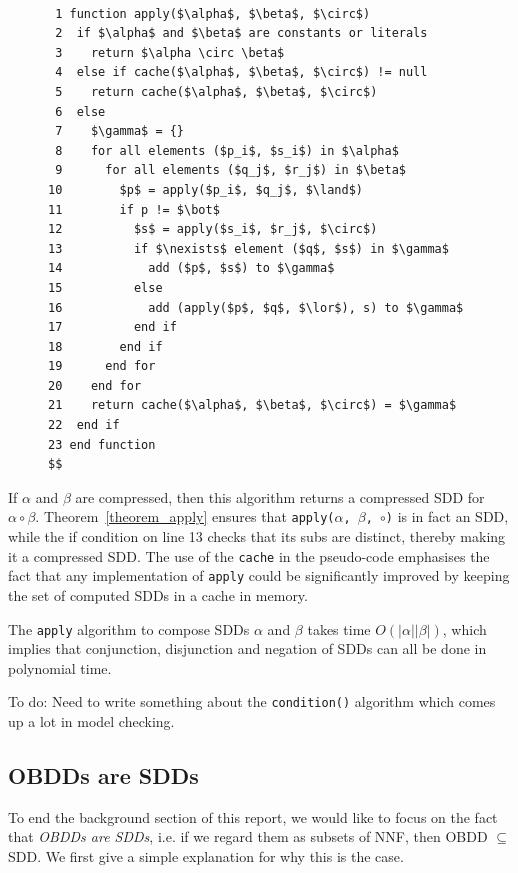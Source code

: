 \documentclass[11pt]{report}
\begin{document}
\label{operations}
 \begin{figure}
 
\begin{lstlisting}[mathescape]

 1 function apply($\alpha$, $\beta$, $\circ$)
 2  if $\alpha$ and $\beta$ are constants or literals
 3    return $\alpha \circ \beta$   
 4  else if cache($\alpha$, $\beta$, $\circ$) != null
 5    return cache($\alpha$, $\beta$, $\circ$)
 6  else
 7    $\gamma$ = {}
 8    for all elements ($p_i$, $s_i$) in $\alpha$
 9      for all elements ($q_j$, $r_j$) in $\beta$ 
10        $p$ = apply($p_i$, $q_j$, $\land$)
11        if p != $\bot$
12          $s$ = apply($s_i$, $r_j$, $\circ$)
13          if $\nexists$ element ($q$, $s$) in $\gamma$
14            add ($p$, $s$) to $\gamma$
15          else 
16            add (apply($p$, $q$, $\lor$), s) to $\gamma$
17          end if
18        end if
19      end for
20    end for
21    return cache($\alpha$, $\beta$, $\circ$) = $\gamma$
22  end if
23 end function
$$
\end{lstlisting}
 \end{figure}


If $\alpha$ and $\beta$ are compressed, then this algorithm returns a compressed SDD for $\alpha \circ \beta$. 
Theorem~\ref{theorem_apply} ensures that \texttt{apply($\alpha$, $\beta$, $\circ$)} is in fact an SDD, while the if condition on line 13 checks that its subs are distinct, thereby making it a compressed SDD. The use of the \texttt{cache} in the pseudo-code emphasises the fact that any implementation of \texttt{apply} could be significantly improved by keeping the set of computed SDDs in a cache in memory. 

The \texttt{apply} algorithm to compose SDDs $\alpha$ and $\beta$ takes time $O(|\alpha||\beta|)$, which implies that conjunction, disjunction and negation of SDDs can all be done in polynomial time.

To do: Need to write something about the \texttt{condition()} algorithm which comes up a lot in model checking.

\subsection{OBDDs are SDDs}
\label{bdds_are_sdds}
To end the background section of this report, we would like to  focus on the fact that \textit{OBDDs are SDDs}, i.e. if we regard them as subsets of NNF, then OBDD $\subseteq$ SDD. We first give a simple explanation for why this is the case. 
\end{document}
